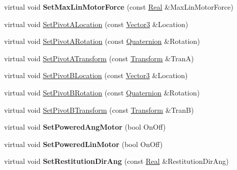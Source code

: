 \begin{DoxyCompactItemize}
\item 
\hypertarget{classMezzanine_1_1SliderConstraint_a174406c54be3f28a45b2776e5ef3ae25}{
virtual void {\bfseries SetMaxLinMotorForce} (const \hyperlink{namespaceMezzanine_a726731b1a7df72bf3583e4a97282c6f6}{Real} \&MaxLinMotorForce)}
\label{classMezzanine_1_1SliderConstraint_a174406c54be3f28a45b2776e5ef3ae25}

\item 
virtual void \hyperlink{classMezzanine_1_1SliderConstraint_a70cf627b28c4031d498557d3011a33c8}{SetPivotALocation} (const \hyperlink{classMezzanine_1_1Vector3}{Vector3} \&Location)
\item 
virtual void \hyperlink{classMezzanine_1_1SliderConstraint_a9a38e7a49caa92f735d6723021aaffea}{SetPivotARotation} (const \hyperlink{classMezzanine_1_1Quaternion}{Quaternion} \&Rotation)
\item 
virtual void \hyperlink{classMezzanine_1_1SliderConstraint_a1655ff22220ff99ada45a98cdb330dfb}{SetPivotATransform} (const \hyperlink{classMezzanine_1_1Transform}{Transform} \&TranA)
\item 
virtual void \hyperlink{classMezzanine_1_1SliderConstraint_ab6705dee13d7311ee381d388ba3122cd}{SetPivotBLocation} (const \hyperlink{classMezzanine_1_1Vector3}{Vector3} \&Location)
\item 
virtual void \hyperlink{classMezzanine_1_1SliderConstraint_a83a627a2875eedbf1ae6ee6db49d866f}{SetPivotBRotation} (const \hyperlink{classMezzanine_1_1Quaternion}{Quaternion} \&Rotation)
\item 
virtual void \hyperlink{classMezzanine_1_1SliderConstraint_a75f675f044faef304729c3ee03eae56b}{SetPivotBTransform} (const \hyperlink{classMezzanine_1_1Transform}{Transform} \&TranB)
\item 
\hypertarget{classMezzanine_1_1SliderConstraint_a2d63361c528d6912377a79745ff92a86}{
virtual void {\bfseries SetPoweredAngMotor} (bool OnOff)}
\label{classMezzanine_1_1SliderConstraint_a2d63361c528d6912377a79745ff92a86}

\item 
\hypertarget{classMezzanine_1_1SliderConstraint_a3591b51811c165bfbbc4b54710f996e0}{
virtual void {\bfseries SetPoweredLinMotor} (bool OnOff)}
\label{classMezzanine_1_1SliderConstraint_a3591b51811c165bfbbc4b54710f996e0}

\item 
\hypertarget{classMezzanine_1_1SliderConstraint_a90e9477eb6957076d58e3a41725a234b}{
virtual void {\bfseries SetRestitutionDirAng} (const \hyperlink{namespaceMezzanine_a726731b1a7df72bf3583e4a97282c6f6}{Real} \&RestitutionDirAng)}
\label{classMezzanine_1_1SliderConstraint_a90e9477eb6957076d58e3a41725a234b}


\end{DoxyCompactItemize}
